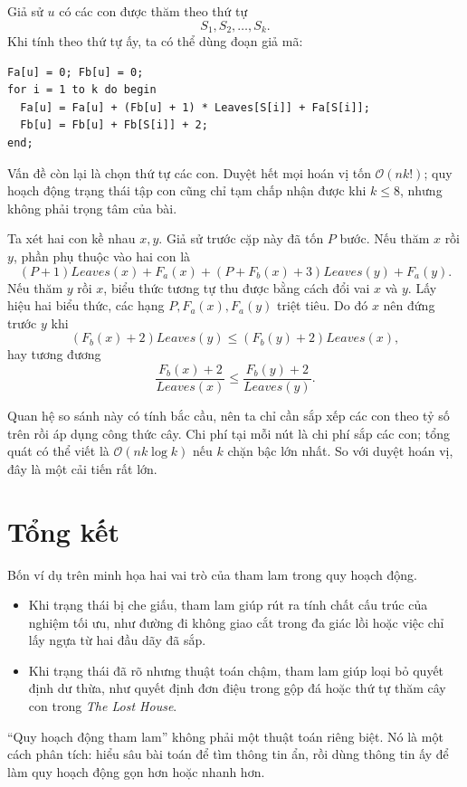 \documentclass[11pt]{article}
\newcommand{\Oh}{\mathcal{O}}
\begin{document}
Giả sử \(u\) có các con được thăm theo thứ tự
\[
  S_1,S_2,\ldots,S_k.
\]
Khi tính theo thứ tự ấy, ta có thể dùng đoạn giả mã:
\begin{verbatim}
Fa[u] = 0; Fb[u] = 0;
for i = 1 to k do begin
  Fa[u] = Fa[u] + (Fb[u] + 1) * Leaves[S[i]] + Fa[S[i]];
  Fb[u] = Fb[u] + Fb[S[i]] + 2;
end;
\end{verbatim}

Vấn đề còn lại là chọn thứ tự các con. Duyệt hết mọi hoán vị tốn
\(\Oh(nk!)\); quy hoạch động trạng thái tập con cũng chỉ tạm chấp nhận được
khi \(k\le 8\), nhưng không phải trọng tâm của bài.

Ta xét hai con kề nhau \(x,y\). Giả sử trước cặp này đã tốn \(P\) bước. Nếu
thăm \(x\) rồi \(y\), phần phụ thuộc vào hai con là
\[
  (P+1)Leaves(x)+F_a(x)+(P+F_b(x)+3)Leaves(y)+F_a(y).
\]
Nếu thăm \(y\) rồi \(x\), biểu thức tương tự thu được bằng cách đổi vai \(x\)
và \(y\). Lấy hiệu hai biểu thức, các hạng \(P,F_a(x),F_a(y)\) triệt tiêu. Do
đó \(x\) nên đứng trước \(y\) khi
\[
  (F_b(x)+2)Leaves(y)\le (F_b(y)+2)Leaves(x),
\]
hay tương đương
\[
  \frac{F_b(x)+2}{Leaves(x)}
  \le
  \frac{F_b(y)+2}{Leaves(y)}.
\]

Quan hệ so sánh này có tính bắc cầu, nên ta chỉ cần sắp xếp các con theo tỷ
số trên rồi áp dụng công thức cây. Chi phí tại mỗi nút là chi phí sắp các con;
tổng quát có thể viết là \(\Oh(nk\log k)\) nếu \(k\) chặn bậc lớn nhất. So với
duyệt hoán vị, đây là một cải tiến rất lớn.

\section{Tổng kết}

Bốn ví dụ trên minh họa hai vai trò của tham lam trong quy hoạch động.
\begin{itemize}
  \item Khi trạng thái bị che giấu, tham lam giúp rút ra tính chất cấu trúc của
  nghiệm tối ưu, như đường đi không giao cắt trong đa giác lồi hoặc việc chỉ
  lấy ngựa từ hai đầu dãy đã sắp.
  \item Khi trạng thái đã rõ nhưng thuật toán chậm, tham lam giúp loại bỏ quyết
  định dư thừa, như quyết định đơn điệu trong gộp đá hoặc thứ tự thăm cây con
  trong \textit{The Lost House}.
\end{itemize}

``Quy hoạch động tham lam'' không phải một thuật toán riêng biệt. Nó là một
cách phân tích: hiểu sâu bài toán để tìm thông tin ẩn, rồi dùng thông tin ấy
để làm quy hoạch động gọn hơn hoặc nhanh hơn.
\end{document}

